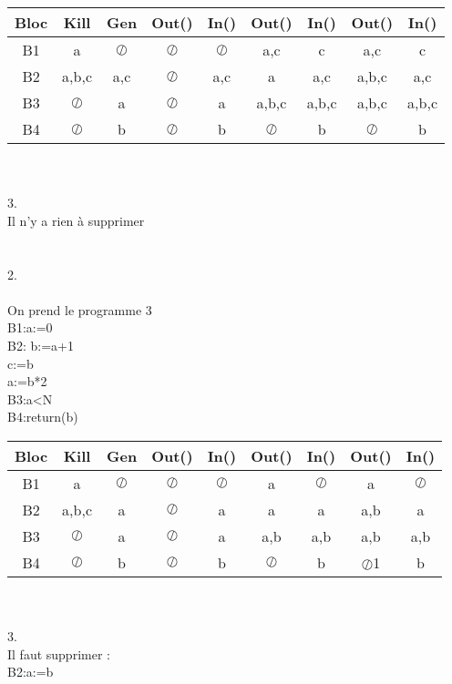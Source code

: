 \documentclass[10pt,a4paper]{article}
\begin{document}
\begin{tabular}{|c|c|c|c|c|c|c|c|c|}
\hline 
Bloc & Kill & Gen & Out() & In() & Out() & In() & Out() & In() \\ 
\hline 
B1 & a & $\oslash$ & $\oslash$ & $\oslash$ & a,c & c & a,c & c \\ 
\hline 
B2 & a,b,c & a,c & $\oslash$ & a,c & a & a,c & a,b,c & a,c \\ 
\hline 
B3 & $\oslash$ & a & $\oslash$ & a & a,b,c & a,b,c & a,b,c & a,b,c \\ 
\hline 
B4 & $\oslash$ & b & $\oslash$ & b & $\oslash$ & b & $\oslash$ & b \\ 
\hline 
\end{tabular} 
\\\\

3.\\

Il n'y a rien à supprimer\\
\\
\\

2.\\\\
On prend le programme 3\\
B1:a:=0\\
B2: b:=a+1\\
c:=b\\
a:=b*2\\
B3:a<N\\
B4:return(b)\\

\begin{tabular}{|c|c|c|c|c|c|c|c|c|}
\hline 
Bloc & Kill & Gen & Out() & In() & Out() & In() & Out() & In() \\ 
\hline 
B1 & a & $\oslash$ & $\oslash$ & $\oslash$ & a & $\oslash$ & a & $\oslash$ \\ 
\hline 
B2 & a,b,c & a & $\oslash$ & a & a & a & a,b & a \\ 
\hline 
B3 & $\oslash$ & a & $\oslash$ & a & a,b & a,b & a,b & a,b \\ 
\hline 
B4 & $\oslash$ & b & $\oslash$ & b & $\oslash$ & b & $\oslash$1 & b \\ 
\hline 
\end{tabular} 
\\
\\

3.\\
Il faut supprimer :\\
B2:a:=b\\
\end{document}
